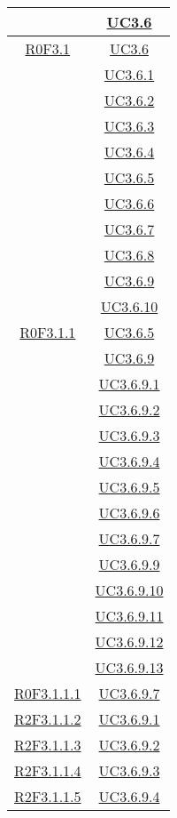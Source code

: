 \begin{longtable}{|c|c|}
& \hyperlink{UC3.6}{UC3.6}\\
\hline
\hyperlink{R0F3.1}{R0F3.1} & \hyperlink{UC3.6}{UC3.6}\\
& \hyperlink{UC3.6.1}{UC3.6.1}\\
& \hyperlink{UC3.6.2}{UC3.6.2}\\
& \hyperlink{UC3.6.3}{UC3.6.3}\\
& \hyperlink{UC3.6.4}{UC3.6.4}\\
& \hyperlink{UC3.6.5}{UC3.6.5}\\
& \hyperlink{UC3.6.6}{UC3.6.6}\\
& \hyperlink{UC3.6.7}{UC3.6.7}\\
& \hyperlink{UC3.6.8}{UC3.6.8}\\
& \hyperlink{UC3.6.9}{UC3.6.9}\\
& \hyperlink{UC3.6.10}{UC3.6.10}\\
\hline
\hyperlink{R0F3.1.1}{R0F3.1.1} & \hyperlink{UC3.6.5}{UC3.6.5}\\
& \hyperlink{UC3.6.9}{UC3.6.9}\\
& \hyperlink{UC3.6.9.1}{UC3.6.9.1}\\
& \hyperlink{UC3.6.9.2}{UC3.6.9.2}\\
& \hyperlink{UC3.6.9.3}{UC3.6.9.3}\\
& \hyperlink{UC3.6.9.4}{UC3.6.9.4}\\
& \hyperlink{UC3.6.9.5}{UC3.6.9.5}\\
& \hyperlink{UC3.6.9.6}{UC3.6.9.6}\\
& \hyperlink{UC3.6.9.7}{UC3.6.9.7}\\
& \hyperlink{UC3.6.9.9}{UC3.6.9.9}\\
& \hyperlink{UC3.6.9.10}{UC3.6.9.10}\\
& \hyperlink{UC3.6.9.11}{UC3.6.9.11}\\
& \hyperlink{UC3.6.9.12}{UC3.6.9.12}\\
& \hyperlink{UC3.6.9.13}{UC3.6.9.13}\\
\hline
\hyperlink{R0F3.1.1.1}{R0F3.1.1.1} & \hyperlink{UC3.6.9.7}{UC3.6.9.7}\\
\hline
\hyperlink{R2F3.1.1.2}{R2F3.1.1.2} & \hyperlink{UC3.6.9.1}{UC3.6.9.1}\\
\hline
\hyperlink{R2F3.1.1.3}{R2F3.1.1.3} & \hyperlink{UC3.6.9.2}{UC3.6.9.2}\\
\hline
\hyperlink{R2F3.1.1.4}{R2F3.1.1.4} & \hyperlink{UC3.6.9.3}{UC3.6.9.3}\\
\hline
\hyperlink{R2F3.1.1.5}{R2F3.1.1.5} & \hyperlink{UC3.6.9.4}{UC3.6.9.4}\\

\end{longtable}
